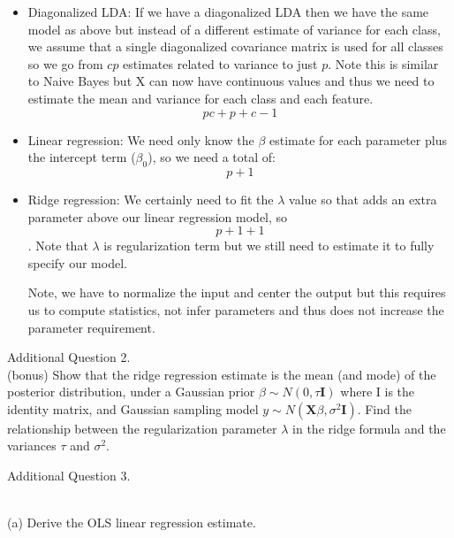 \documentclass[draft]{exam} %
\theoremstyle{definition} \newtheorem*{defn}{Definition}
\begin{document}
\begin{questions}
\begin{solution}
\begin{itemize}
    \item Diagonalized LDA: If we have a diagonalized LDA then we have the
    same model as above but instead of a different estimate of variance for
    each class, we assume that a single diagonalized covariance matrix is
    used for all classes so we go from $cp$ estimates related to variance to
    just $p$. Note this is similar to Naive Bayes but X can now have
    continuous values and thus we need to estimate the mean and variance for
    each class and each feature.
    \[pc+p+c-1\]

    \item Linear regression: We need only know the $\beta$ estimate for each
    parameter plus the intercept term ($\beta_0$), so we need a total of:
    \[p+1\]

    \item Ridge regression: We certainly need to fit the $\lambda$ value so
    that adds an extra parameter above our linear regression model, so \[p+1
    + 1\]. Note that $\lambda$ is regularization term but we still need to
    estimate it to fully specify our model.

    Note, we have to normalize the input and center the output but this
    requires us to compute statistics, not infer parameters and thus does
    not increase the parameter requirement.
    \end{itemize}

\end{solution}


\question Additional Question 2. \\
(bonus) Show that the ridge regression estimate is the mean (and mode) of the posterior distribution, under a Gaussian prior $\beta \sim N (0, \tau \pmb{I})$ where I is the identity matrix, and Gaussian sampling model $y \sim N (\pmb{X}\beta, \sigma^2\pmb{I})$. Find the relationship between the regularization parameter $\lambda$ in the ridge formula and the variances $\tau$ and $\sigma^2$. \\

\begin{solution}  %

\end{solution}


\question Additional Question 3. \\

\begin{solution} \\ %
(a) Derive the OLS linear regression estimate. \\


\end{solution}
\end{questions}
\end{document}

